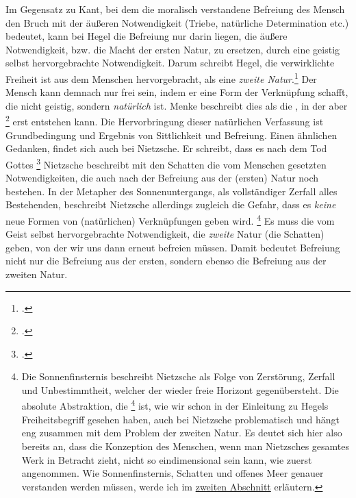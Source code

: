 \documentclass[12pt, a4paper, openany]{report}
\begin{document}
Im Gegensatz zu Kant, bei dem die moralisch verstandene Befreiung des Mensch den Bruch mit der äußeren Notwendigkeit (Triebe, natürliche Determination etc.) bedeutet, kann bei Hegel die Befreiung nur darin liegen, die äußere Notwendigkeit, bzw. die Macht der ersten Natur, zu ersetzen, durch eine geistig selbst hervorgebrachte Notwendigkeit.
Darum schreibt Hegel, die verwirklichte Freiheit ist aus dem Menschen hervorgebracht, als eine \emph{zweite Natur}.\footcite[Vlg.][§ 4, S. 34.]{hegel_grundlinien_2017}
Der Mensch kann demnach nur frei sein, indem er eine Form der Verknüpfung schafft, die nicht geistig, sondern \emph{natürlich} ist. 
Menke beschreibt dies als die , in der aber \footcite[][40. Hervorhebung von mir]{menke_autonomie_2018} erst entstehen kann.
Die Hervorbringung dieser natürlichen Verfassung ist Grundbedingung und Ergebnis von Sittlichkeit und Befreiung.
Einen ähnlichen Gedanken, findet sich auch bei Nietzsche. Er schreibt, dass es nach dem Tod Gottes \footcite[][467]{nietzsche_morgenrote_1999}
Nietzsche beschreibt mit den Schatten die vom Menschen gesetzten Notwendigkeiten, die auch nach der Befreiung aus der (ersten) Natur noch bestehen. 
In der Metapher des Sonnenuntergangs, als vollständiger Zerfall alles Bestehenden, beschreibt Nietzsche allerdings zugleich die Gefahr, dass es \emph{keine} neue Formen von (natürlichen) Verknüpfungen geben wird.%
\footnote{
    Die Sonnenfinsternis beschreibt Nietzsche als Folge von Zerstörung, Zerfall und Unbestimmtheit, welcher der wieder freie Horizont gegenübersteht. 
    Die absolute Abstraktion, die \footcite[][§ 5 A, S. 39.]{hegel_grundlinien_2017} ist, wie wir schon in der Einleitung zu Hegels Freiheitsbegriff gesehen haben, auch bei Nietzsche problematisch und hängt eng zusammen mit dem Problem der zweiten Natur.
    Es deutet sich hier also bereits an, dass die Konzeption des  Menschen, wenn man Nietzsches gesamtes Werk in Betracht zieht, nicht so eindimensional sein kann, wie zuerst angenommen.
    Wie Sonnenfinsternis, Schatten und offenes Meer genauer verstanden werden müssen, werde ich im \hyperref[abschnitt_2]{zweiten Abschnitt} erläutern.
}
Es muss die vom Geist selbst hervorgebrachte Notwendigkeit, die \emph{zweite} Natur (die Schatten) geben, von der wir uns dann erneut befreien müssen.
Damit bedeutet Befreiung nicht nur die Befreiung aus der ersten, sondern ebenso die Befreiung aus der zweiten Natur. 
\end{document}
